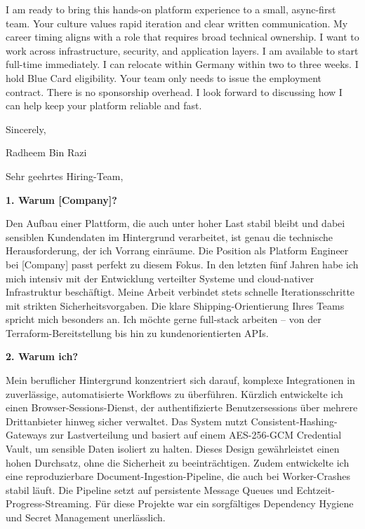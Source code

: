 \documentclass[11pt,a4paper]{coverletter}
\begin{document}
I am ready to bring this hands-on platform experience to a small, async-first team. Your culture values rapid iteration and clear written communication. My career timing aligns with a role that requires broad technical ownership. I want to work across infrastructure, security, and application layers. I am available to start full-time immediately. I can relocate within Germany within two to three weeks. I hold Blue Card eligibility. Your team only needs to issue the employment contract. There is no sponsorship overhead. I look forward to discussing how I can help keep your platform reliable and fast.

\closing{Sincerely,}{Radheem Bin Razi}

\clearpage
{}


\opening{Sehr geehrtes Hiring-Team,}

\vspace{8pt}\noindent\textbf{1. Warum [Company]?}\par\vspace{3pt}

Den Aufbau einer Plattform, die auch unter hoher Last stabil bleibt und dabei sensiblen Kundendaten im Hintergrund verarbeitet, ist genau die technische Herausforderung, der ich Vorrang einräume. Die Position als Platform Engineer bei [Company] passt perfekt zu diesem Fokus. In den letzten fünf Jahren habe ich mich intensiv mit der Entwicklung verteilter Systeme und cloud-nativer Infrastruktur beschäftigt. Meine Arbeit verbindet stets schnelle Iterationsschritte mit strikten Sicherheitsvorgaben. Die klare Shipping-Orientierung Ihres Teams spricht mich besonders an. Ich möchte gerne full-stack arbeiten – von der Terraform-Bereitstellung bis hin zu kundenorientierten APIs.

\vspace{8pt}\noindent\textbf{2. Warum ich?}\par\vspace{3pt}

Mein beruflicher Hintergrund konzentriert sich darauf, komplexe Integrationen in zuverlässige, automatisierte Workflows zu überführen. Kürzlich entwickelte ich einen Browser-Sessions-Dienst, der authentifizierte Benutzersessions über mehrere Drittanbieter hinweg sicher verwaltet. Das System nutzt Consistent-Hashing-Gateways zur Lastverteilung und basiert auf einem AES-256-GCM Credential Vault, um sensible Daten isoliert zu halten. Dieses Design gewährleistet einen hohen Durchsatz, ohne die Sicherheit zu beeinträchtigen. Zudem entwickelte ich eine reproduzierbare Document-Ingestion-Pipeline, die auch bei Worker-Crashes stabil läuft. Die Pipeline setzt auf persistente Message Queues und Echtzeit-Progress-Streaming. Für diese Projekte war ein sorgfältiges Dependency Hygiene und Secret Management unerlässlich.
\end{document}

